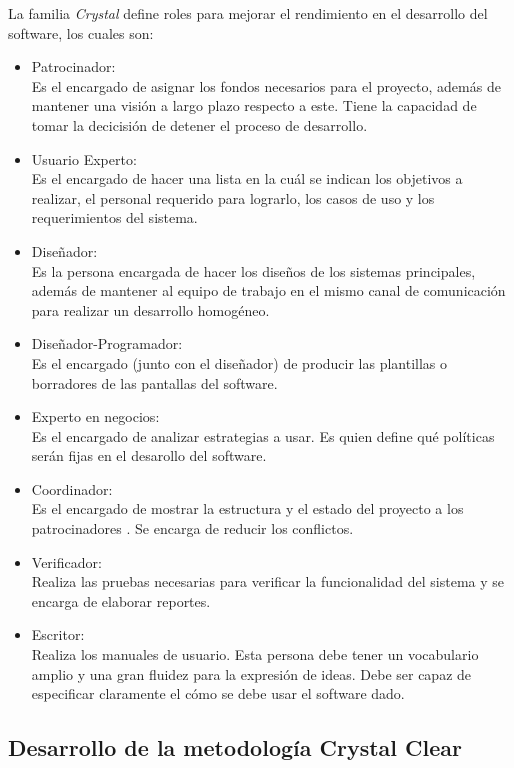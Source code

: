\documentclass[12pt,a4paper]{article}
\begin{document}
	
	La familia {\itshape Crystal} define roles para mejorar el rendimiento en el desarrollo del software, los cuales son:
	\begin{itemize}
		\item Patrocinador:\\
		Es el encargado de asignar los fondos necesarios para el proyecto, adem\'as de mantener una visi\'on a largo plazo respecto a este. Tiene la capacidad de tomar la decicisi\'on de detener el proceso de desarrollo.
		\item Usuario Experto:\\
		Es el encargado de hacer una lista en la cu\'al se indican los objetivos a realizar, el personal requerido para lograrlo, los casos de uso y los requerimientos del sistema. 
		\item Dise\~nador:\\
		Es la persona encargada de hacer los dise\~nos de los sistemas principales, adem\'as de mantener al equipo de trabajo en el mismo canal de comunicaci\'on para realizar un desarrollo homog\'eneo.
		\item Dise\~nador-Programador:\\
		Es el encargado (junto con el dise\~nador) de producir las plantillas o borradores de las pantallas del software.
		\item Experto en negocios:\\
		Es el encargado de analizar estrategias a usar. Es quien define qu\'e pol\'iticas ser\'an fijas en el desarollo del software.
		\item Coordinador:\\
		Es el encargado de mostrar la estructura y el estado del proyecto a los patrocinadores . Se encarga de reducir los conflictos.
		\item Verificador:\\
		Realiza las pruebas necesarias para verificar la funcionalidad del sistema y se encarga de elaborar reportes.
		\item Escritor:\\
	Realiza los manuales de usuario. Esta persona debe tener un vocabulario amplio y una gran fluidez para la expresi\'on de ideas. Debe ser capaz de especificar claramente el c\'omo se debe usar el software dado.      
	\end{itemize}

	\subsection*{Desarrollo de la metodolog\'ia Crystal Clear}
		
\end{document}
